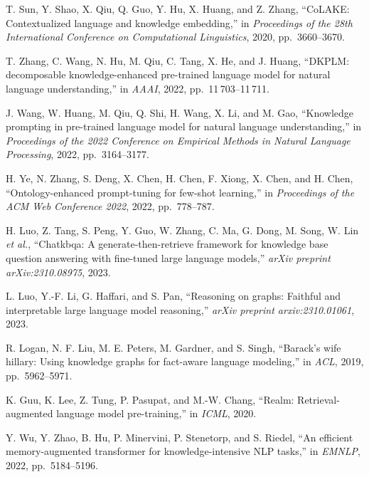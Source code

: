 \begin{enumerate}[leftmargin=2em,label={[\arabic*]}]
\item T. Sun, Y. Shao, X. Qiu, Q. Guo, Y. Hu, X. Huang, and Z. Zhang, ``CoLAKE: Contextualized language and knowledge embedding,'' in \textit{Proceedings of the 28th International Conference on Computational Linguistics}, 2020, pp.~3660--3670.

\item T. Zhang, C. Wang, N. Hu, M. Qiu, C. Tang, X. He, and J. Huang, ``DKPLM: decomposable knowledge-enhanced pre-trained language model for natural language understanding,'' in \textit{AAAI}, 2022, pp.~11\,703--11\,711.

\item J. Wang, W. Huang, M. Qiu, Q. Shi, H. Wang, X. Li, and M. Gao, ``Knowledge prompting in pre-trained language model for natural language understanding,'' in \textit{Proceedings of the 2022 Conference on Empirical Methods in Natural Language Processing}, 2022, pp.~3164--3177.

\item H. Ye, N. Zhang, S. Deng, X. Chen, H. Chen, F. Xiong, X. Chen, and H. Chen, ``Ontology-enhanced prompt-tuning for few-shot learning,'' in \textit{Proceedings of the ACM Web Conference 2022}, 2022, pp.~778--787.

\item H. Luo, Z. Tang, S. Peng, Y. Guo, W. Zhang, C. Ma, G. Dong, M. Song, W. Lin \textit{et al.}, ``Chatkbqa: A generate-then-retrieve framework for knowledge base question answering with fine-tuned large language models,'' \textit{arXiv preprint arXiv:2310.08975}, 2023.

\item L. Luo, Y.-F. Li, G. Haffari, and S. Pan, ``Reasoning on graphs: Faithful and interpretable large language model reasoning,'' \textit{arXiv preprint arxiv:2310.01061}, 2023.

\item R. Logan, N. F. Liu, M. E. Peters, M. Gardner, and S. Singh, ``Barack's wife hillary: Using knowledge graphs for fact-aware language modeling,'' in \textit{ACL}, 2019, pp.~5962--5971.

\item K. Guu, K. Lee, Z. Tung, P. Pasupat, and M.-W. Chang, ``Realm: Retrieval-augmented language model pre-training,'' in \textit{ICML}, 2020.

\item Y. Wu, Y. Zhao, B. Hu, P. Minervini, P. Stenetorp, and S. Riedel, ``An efficient memory-augmented transformer for knowledge-intensive NLP tasks,'' in \textit{EMNLP}, 2022, pp.~5184--5196.


\end{enumerate}
